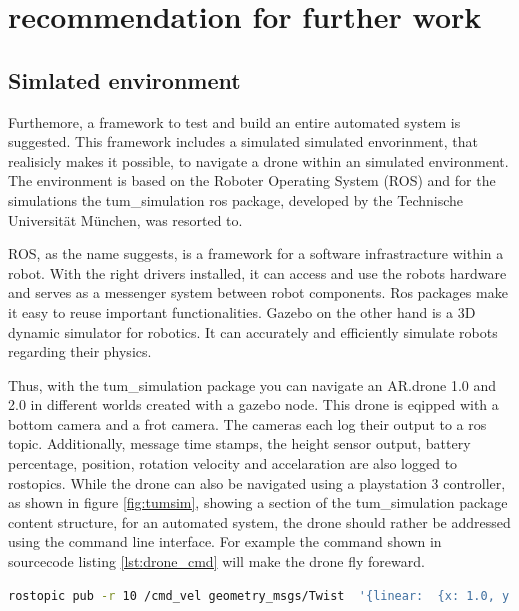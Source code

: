 \chapter{recommendation for further work}
\section{Simlated environment}

	Furthemore, a framework to test and build an entire automated system is suggested. This framework includes a simulated 
	simulated envorinment, that realisicly makes it possible, to navigate a drone within an simulated environment. The environment 
	is based on the Roboter Operating System (ROS) and for the simulations the tum\_simulation ros package, developed by the Technische Universität 
	München, was resorted to. 
	
	
	ROS, as the name suggests, is a framework for a software infrastracture within a robot. With the right drivers installed, 
	it can access and use the robots hardware and serves as a messenger system between robot components. Ros packages make it easy to 
	reuse important functionalities. Gazebo on the other hand is a 3D dynamic simulator for robotics. It can accurately and efficiently simulate robots regarding
	their physics. 
	
	
	Thus, with the tum\_simulation package you can navigate an AR.drone 1.0 and 2.0 in different worlds created with a gazebo node. This drone is eqipped with a bottom camera 
	and a frot camera. The cameras each log their output to a ros topic. Additionally, message time stamps, the height sensor output, 
	battery percentage, position, rotation
	velocity and accelaration are also logged to rostopics. While the drone can also be navigated using a playstation 3 controller, as shown in figure 
	\ref{fig:tumsim}, showing a section of the tum\_simulation package content structure, 
	for an automated system, the drone should rather be addressed using the command line interface. For example 
	the command shown in sourcecode listing \ref{lst:drone_cmd} will make the drone fly foreward. 
	
	\begin{lstlisting}[language=bash, caption=drone navigation command, label=lst:drone_cmd]
    rostopic pub -r 10 /cmd_vel geometry_msgs/Twist  '{linear:  {x: 1.0, y: 0.0, z: 0.0}, angular: {x: 0.0,y: 0.0,z: 0.0}}'
	\end{lstlisting}
	
	
